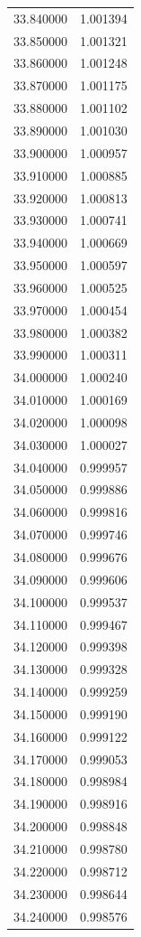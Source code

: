 \begin{tabular}{rr}
33.840000 & 1.001394 \\
33.850000 & 1.001321 \\
33.860000 & 1.001248 \\
33.870000 & 1.001175 \\
33.880000 & 1.001102 \\
33.890000 & 1.001030 \\
33.900000 & 1.000957 \\
33.910000 & 1.000885 \\
33.920000 & 1.000813 \\
33.930000 & 1.000741 \\
33.940000 & 1.000669 \\
33.950000 & 1.000597 \\
33.960000 & 1.000525 \\
33.970000 & 1.000454 \\
33.980000 & 1.000382 \\
33.990000 & 1.000311 \\
34.000000 & 1.000240 \\
34.010000 & 1.000169 \\
34.020000 & 1.000098 \\
34.030000 & 1.000027 \\
34.040000 & 0.999957 \\
34.050000 & 0.999886 \\
34.060000 & 0.999816 \\
34.070000 & 0.999746 \\
34.080000 & 0.999676 \\
34.090000 & 0.999606 \\
34.100000 & 0.999537 \\
34.110000 & 0.999467 \\
34.120000 & 0.999398 \\
34.130000 & 0.999328 \\
34.140000 & 0.999259 \\
34.150000 & 0.999190 \\
34.160000 & 0.999122 \\
34.170000 & 0.999053 \\
34.180000 & 0.998984 \\
34.190000 & 0.998916 \\
34.200000 & 0.998848 \\
34.210000 & 0.998780 \\
34.220000 & 0.998712 \\
34.230000 & 0.998644 \\
34.240000 & 0.998576 \\

\end{tabular}

